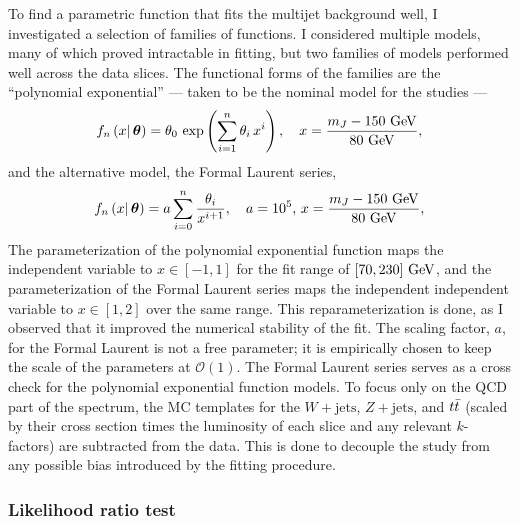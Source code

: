 To find a parametric function that fits the multijet background well, I investigated a selection of families of functions.
I considered multiple models, many of which proved intractable in fitting, but two families of models performed well across the \CRQCD{} data slices.
The functional forms of the families are the ``polynomial exponential'' --- taken to be the nominal model for the studies ---
\begin{equation}
 f_{n} \left(x \middle|\,\boldsymbol{\theta}\right) = \theta_{0}\, \exp\left(\sum_{i=1}^{n} \theta_{i}\,x^{i}\right), \quad x = \frac{m_{J} - 150~\mathrm{GeV}}{80~\mathrm{GeV}},
 \label{eq:poly_exp}
\end{equation}
and the alternative model, the Formal Laurent series,
\begin{equation}
 f_{n} \left(x \middle|\,\boldsymbol{\theta}\right) = a \sum_{i=0}^{n} \frac{\theta_{i}}{x^{i+1}}, \quad a=10^{5},\,x = \frac{m_{J} - 150~\mathrm{GeV}}{80~\mathrm{GeV}},
 \label{eq:formal_laurent}
\end{equation}
The parameterization of the polynomial exponential function maps the independent variable to $x \in \left[-1,1\right]$ for the fit range of $[70,230]~\mathrm{GeV}$, and the parameterization of the Formal Laurent series maps the independent independent variable to $x \in \left[1,2\right]$ over the same range.
This reparameterization is done, as I observed that it improved the numerical stability of the fit.
The scaling factor, $a$, for the Formal Laurent is not a free parameter; it is empirically chosen to keep the scale of the parameters at $\mathcal{O}(1)$.
The Formal Laurent series serves as a cross check for the polynomial exponential function models.
To focus only on the QCD part of the spectrum, the MC templates for the $W+\mathrm{jets}$, $Z+\mathrm{jets}$, and $t\bar{t}$ (scaled by their cross section times the luminosity of each slice and any relevant $k$-factors) are subtracted from the data.
This is done to decouple the study from any possible bias introduced by the fitting procedure.

\subsubsection{Likelihood ratio test}


